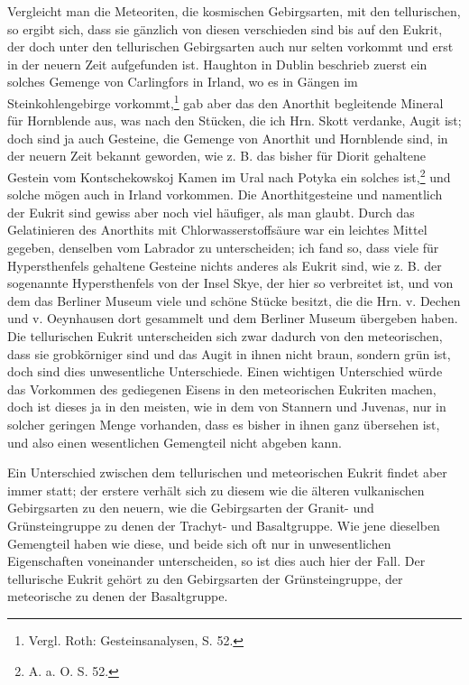 \documentclass[a4paper, 11pt, oneside]{article}
\begin{document}
Vergleicht man die Meteoriten, die kosmischen Gebirgsarten, mit den tellurischen, so ergibt sich, dass sie gänzlich von diesen verschieden sind bis auf den Eukrit, der doch unter den tellurischen Gebirgsarten auch nur selten vorkommt und erst in der neuern Zeit aufgefunden ist. Haughton in Dublin beschrieb zuerst ein solches Gemenge von Carlingfors in Irland, wo es in Gängen im Steinkohlengebirge vorkommt,\footnote{Vergl. Roth: Gesteinsanalysen, S. 52.} gab aber das den Anorthit begleitende Mineral für Hornblende aus, was nach den Stücken, die ich Hrn. Skott verdanke, Augit ist; doch sind ja auch Gesteine, die Gemenge von Anorthit und Hornblende sind, in der neuern Zeit bekannt geworden, wie z. B. das bisher für Diorit gehaltene Gestein vom Kontschekowskoj Kamen im Ural nach Potyka ein solches ist,\footnote{A. a. O. S. 52.} und solche mögen auch in Irland vorkommen. Die Anorthitgesteine und namentlich der Eukrit sind gewiss aber noch viel häufiger, als man glaubt. Durch das Gelatinieren des Anorthits mit Chlorwasserstoffsäure war ein leichtes Mittel gegeben, denselben vom Labrador zu unterscheiden; ich fand so, dass viele für Hypersthenfels gehaltene Gesteine nichts anderes als Eukrit sind, wie z. B. der sogenannte Hypersthenfels von der Insel Skye, der hier so verbreitet ist, und von dem das Berliner Museum viele und schöne Stücke besitzt, die die Hrn. v. Dechen und v. Oeynhausen dort gesammelt und dem Berliner Museum übergeben haben. Die tellurischen Eukrit unterscheiden sich zwar dadurch von den meteorischen, dass sie grobkörniger sind und das Augit in ihnen nicht braun, sondern grün ist, doch sind dies unwesentliche Unterschiede. Einen wichtigen Unterschied würde das Vorkommen des gediegenen Eisens in den meteorischen Eukriten machen, doch ist dieses ja in den meisten, wie in dem von Stannern und Juvenas, nur in solcher geringen Menge vorhanden, dass es bisher in ihnen ganz übersehen ist, und also einen wesentlichen Gemengteil nicht abgeben kann.

Ein Unterschied zwischen dem tellurischen und meteorischen Eukrit findet aber immer statt; der erstere verhält sich zu diesem wie die älteren vulkanischen Gebirgsarten zu den neuern, wie die Gebirgsarten der Granit- und Grünsteingruppe zu denen der Trachyt- und Basaltgruppe. Wie jene dieselben Gemengteil haben wie diese, und beide sich oft nur in unwesentlichen Eigenschaften voneinander unterscheiden, so ist dies auch hier der Fall. Der tellurische Eukrit gehört zu den Gebirgsarten der Grünsteingruppe, der meteorische zu denen der Basaltgruppe.
\end{document}
